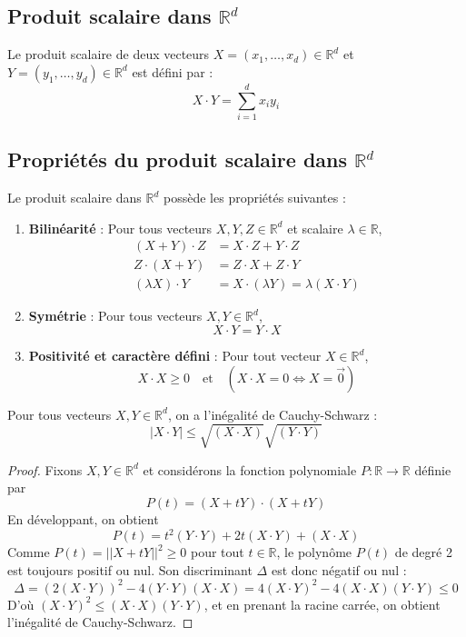 \documentclass[oneside]{book}
\begin{document}
\subsection{Produit scalaire dans $\mathbb{R}^d$}

\begin{definition}
Le produit scalaire de deux vecteurs $X = (x_1, \ldots, x_d) \in \mathbb{R}^d$ et $Y = (y_1, \ldots, y_d) \in \mathbb{R}^d$ est défini par :
\[
X \cdot Y = \sum_{i=1}^d x_i y_i
\]
\end{definition}

\subsection{Propriétés du produit scalaire dans $\mathbb{R}^d$}

Le produit scalaire dans $\mathbb{R}^d$ possède les propriétés suivantes :

\begin{enumerate}
    \item \textbf{Bilinéarité} :
    Pour tous vecteurs $X, Y, Z \in \mathbb{R}^d$ et scalaire $\lambda \in \mathbb{R}$,
    \begin{align*}
        (X + Y) \cdot Z &= X \cdot Z + Y \cdot Z \\
        Z \cdot (X + Y) &= Z \cdot X + Z \cdot Y \\
        (\lambda X) \cdot Y &= X \cdot (\lambda Y) = \lambda (X \cdot Y)
    \end{align*}
    \item \textbf{Symétrie} :
    Pour tous vecteurs $X, Y \in \mathbb{R}^d$,
    \[
    X \cdot Y = Y \cdot X
    \]
    \item \textbf{Positivité et caractère défini} :
    Pour tout vecteur $X \in \mathbb{R}^d$,
    \[
    X \cdot X \geq 0 \quad \text{et} \quad (X \cdot X = 0 \iff X = \overrightarrow{0})
    \]
\end{enumerate}

\begin{proposition}
Pour tous vecteurs $X, Y \in \mathbb{R}^d$, on a l'inégalité de Cauchy-Schwarz :
\[
|X \cdot Y| \leq \sqrt{(X \cdot X)} \sqrt{(Y \cdot Y)}
\]
\end{proposition}

\begin{proof}
Fixons $X, Y \in \mathbb{R}^d$ et considérons la fonction polynomiale $P : \mathbb{R} \to \mathbb{R}$ définie par
\[
P(t) = (X + tY) \cdot (X + tY)
\]
En développant, on obtient
\[
P(t) = t^2 (Y \cdot Y) + 2t (X \cdot Y) + (X \cdot X)
\]
Comme $P(t) = ||X + tY||^2 \geq 0$ pour tout $t \in \mathbb{R}$, le polynôme $P(t)$ de degré 2 est toujours positif ou nul. Son discriminant $\Delta$ est donc négatif ou nul :
\[
\Delta = (2(X \cdot Y))^2 - 4 (Y \cdot Y) (X \cdot X) = 4 (X \cdot Y)^2 - 4 (X \cdot X) (Y \cdot Y) \leq 0
\]
D'où $(X \cdot Y)^2 \leq (X \cdot X) (Y \cdot Y)$, et en prenant la racine carrée, on obtient l'inégalité de Cauchy-Schwarz.
\end{proof}
\end{document}
